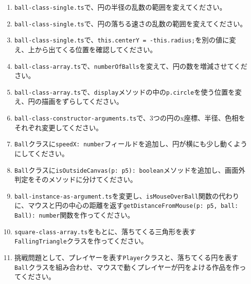 \begin{enumerate}
    \item \texttt{ball-class-single.ts}で、円の半径の乱数の範囲を変えてください。
    \item \texttt{ball-class-single.ts}で、円の落ちる速さの乱数の範囲を変えてください。
    \item \texttt{ball-class-single.ts}で、\texttt{this.centerY = -this.radius;}を別の値に変え、上から出てくる位置を確認してください。
    \item \texttt{ball-class-array.ts}で、\texttt{numberOfBalls}を変えて、円の数を増減させてください。
    \item \texttt{ball-class-array.ts}で、\texttt{display}メソッドの中の\texttt{p.circle}を使う位置を変え、円の描画をずらしてください。
    \item \texttt{ball-class-constructor-arguments.ts}で、3つの円のx座標、半径、色相をそれぞれ変更してください。
    \item \texttt{Ball}クラスに\texttt{speedX: number}フィールドを追加し、円が横にも少し動くようにしてください。
    \item \texttt{Ball}クラスに\texttt{isOutsideCanvas(p: p5): boolean}メソッドを追加し、画面外判定をそのメソッドに分けてください。
    \item \texttt{ball-instance-as-argument.ts}を変更し、\texttt{isMouseOverBall}関数の代わりに、マウスと円の中心の距離を返す\texttt{getDistanceFromMouse(p: p5, ball: Ball): number}関数を作ってください。
    \item \texttt{square-class-array.ts}をもとに、落ちてくる三角形を表す\texttt{FallingTriangle}クラスを作ってください。
    \item 挑戦問題として、プレイヤーを表す\texttt{Player}クラスと、落ちてくる円を表す\texttt{Ball}クラスを組み合わせ、マウスで動くプレイヤーが円をよける作品を作ってください。
\end{enumerate}

